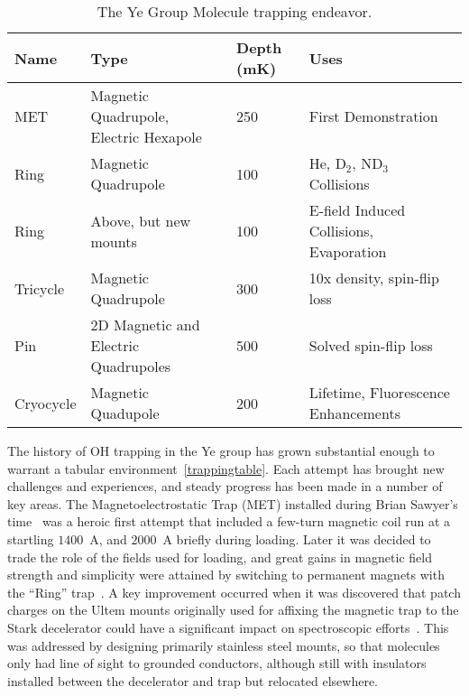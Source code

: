 \renewcommand{\arraystretch}{1.5}
\begin{table}[t!]
\centering
\caption{
The Ye Group Molecule trapping endeavor.\label{trappingtable}
}
\label{tab:rates}
\begin{tabular}{ L{2.5cm} | C{4.5cm} C{2.5cm} C{4.5cm} }
Name & Type & Depth (mK) & Uses \\
\hline\hline
MET 	& Magnetic Quadrupole, Electric Hexapole & 250 	& First Demonstration~\cite{Sawyer2007} 	 \\
\hline
Ring 		& Magnetic Quadrupole				& 100 	& He, D$_2$, ND$_3$ Collisions~\cite{Sawyer2008,Sawyer2011} \\
\hline
Ring 		& Above, but new mounts				& 100 	& E-field Induced Collisions,  Evaporation~\cite{Stuhl2012uwave,Stuhl2012evap,Stuhl2013} \\
\hline
Tricycle 	& Magnetic Quadrupole 				& 300 	& 10x density, spin-flip loss \\
\hline
Pin  		& 2D Magnetic and Electric Quadrupoles 	& 500 	& Solved spin-flip loss~\cite{Reens2017}\\
\hline
Cryocycle 	& Magnetic Quadupole 				& 200 	& Lifetime, Fluorescence Enhancements\\
\end{tabular}
\end{table}

The history of OH trapping in the Ye group has grown substantial enough to warrant a tabular environment~\ref{trappingtable}. 
Each attempt has brought new challenges and experiences, and steady progress has been made in a number of key areas.
The Magnetoelectrostatic Trap (MET) installed during Brian Sawyer's time~\cite{Sawyer2007} was a heroic first attempt that included a few-turn magnetic coil run at a startling $1400$~A, and $2000$~A briefly during loading.
Later it was decided to trade the role of the fields used for loading, and great gains in magnetic field strength and simplicity were attained by switching to permanent magnets with the ``Ring'' trap~\cite{Sawyer2011}.
A key improvement occurred when it was discovered that patch charges on the Ultem mounts originally used for affixing the magnetic trap to the Stark decelerator could have a significant impact on spectroscopic efforts~\citep[Fig.~6]{Stuhl2012uwave}.
This was addressed by designing primarily stainless steel mounts, so that molecules only had line of sight to grounded conductors, although still with insulators installed between the decelerator and trap but relocated elsewhere.

